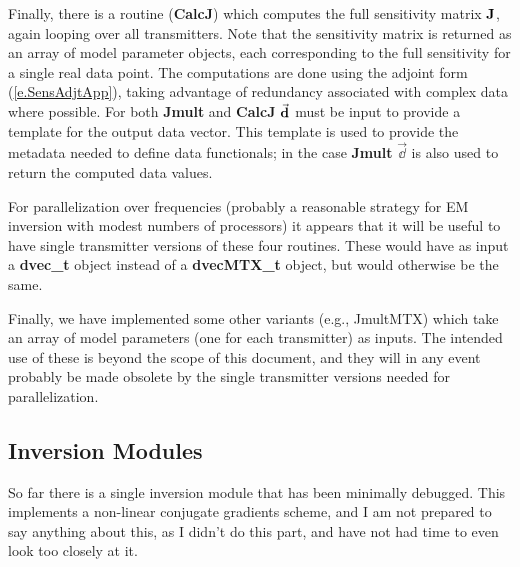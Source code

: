 Finally, there is a routine ({\bf CalcJ}) which computes the full
sensitivity matrix ${\bf J}$, again looping over all transmitters.
Note that the sensitivity matrix is returned as an array
of model parameter objects, each corresponding to the full
sensitivity for a single real data point.  The computations
are done using the adjoint form (\ref{e.SensAdjtApp}),
taking advantage of redundancy associated with complex
data where possible.  For both {\bf Jmult} and {\bf CalcJ}
$\vec{\bf d}$ must be input to provide a template
for the output data vector.  This template is used
to provide the metadata needed to define data functionals;
in the case {\bf Jmult} $\vec\dd$ is also used to return the
computed data values.

For parallelization over frequencies
(probably a reasonable strategy for EM inversion
with modest numbers of processors) it appears that it will
be useful to have single transmitter versions of these four
routines.  These would have as input a {\bf dvec\_t} object
instead of a {\bf dvecMTX\_t} object, but would otherwise
be the same.

Finally, we have implemented some other variants (e.g., JmultMTX)
which take an array of model parameters (one for each
transmitter) as inputs.  The intended use of these is
beyond the scope of this document,  and they will in
any event probably be made obsolete by the 
single transmitter versions needed for parallelization.

\subsection{Inversion Modules}

So far there is a single inversion module that has
been minimally debugged.  This implements a non-linear
conjugate gradients scheme, and I am not prepared to
say anything about this, as I didn't do this part,
and have not had time to even look too closely at it.
